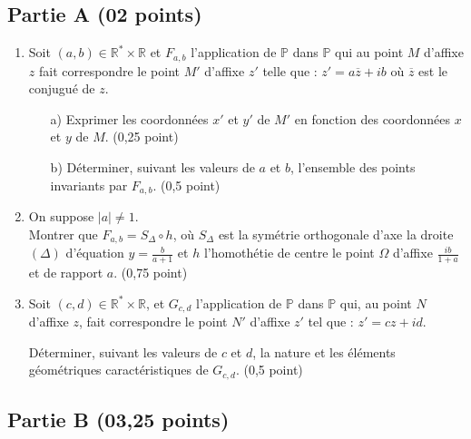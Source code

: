 \documentclass[11pt]{article}
\begin{document}
\subsection*{Partie A (02 points)}
\begin{enumerate}
    \item Soit \( (a, b) \in \mathbb{R}^* \times \mathbb{R} \) et \( F_{a,b} \) l'application de \( \mathbb{P} \) dans \( \mathbb{P} \) qui au point \( M \) d'affixe \( z \) fait correspondre le point \( M' \) d'affixe \( z' \) telle que : \( z' = a \overline{z} + ib  \) où \( \overline{z} \) est le conjugué de \( z \).

    \begin{enumerate}
        \item[a)] Exprimer les coordonnées \( x' \) et \( y' \) de \( M' \) en fonction des coordonnées \( x \) et \( y \) de \( M \). \hfill (0,25 point)

        \item[b)] Déterminer, suivant les valeurs de \( a \) et \( b \), l'ensemble des points invariants par \( F_{a,b} \). \hfill (0,5 point)
    \end{enumerate}

\item On suppose \( |a| \ne 1 \). \\
Montrer que \( F_{a,b} = S_{\Delta} \circ h \), où \( S_{\Delta} \) est la symétrie orthogonale d'axe la droite \( (\Delta) \) d'équation \( y = \frac{b}{a + 1} \) et \( h \) l'homothétie de centre le point \( \Omega \) d'affixe \( \frac{ib}{1 + a} \) et de rapport \( a \). \hfill (0,75 point)

\item Soit \( (c, d) \in \mathbb{R}^* \times \mathbb{R} \), et \( G_{c,d} \) l'application de \( \mathbb{P} \) dans \( \mathbb{P} \) qui, au point \( N \) d'affixe \( z \), fait correspondre le point \( N' \) d'affixe \( z' \) tel que : \( z' = cz + id. \)

Déterminer, suivant les valeurs de \( c \) et \( d \), la nature et les éléments géométriques caractéristiques de \( G_{c,d} \). \hfill (0,5 point)

\end{enumerate}

\subsection*{Partie B (03,25 points)}
\end{document}
